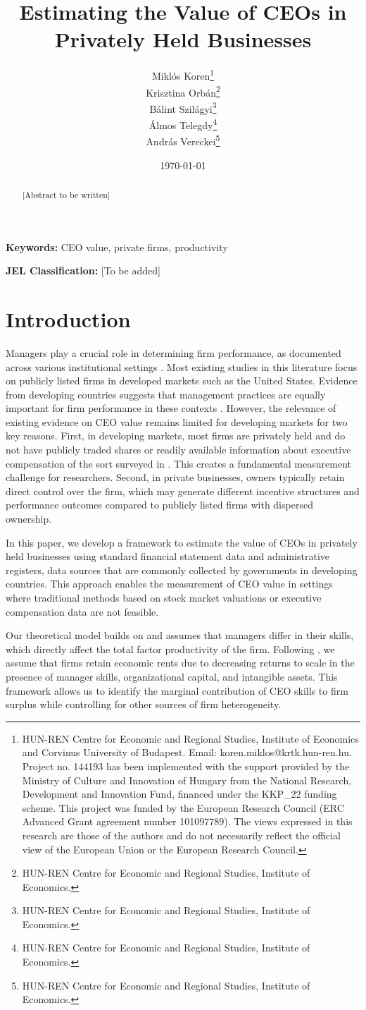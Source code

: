 \documentclass[11pt,a4paper]{article}
\title{Estimating the Value of CEOs in Privately Held Businesses}
\author{Miklós Koren\thanks{HUN-REN Centre for Economic and Regional Studies, Institute of Economics and Corvinus University of Budapest. Email: koren.miklos@krtk.hun-ren.hu. Project no. 144193 has been implemented with the support provided by the Ministry of Culture and Innovation of Hungary from the National Research, Development and Innovation Fund, financed under the KKP\_22 funding scheme. This project was funded by the European Research Council (ERC Advanced Grant agreement number 101097789). The views expressed in this research are those of the authors and do not necessarily reflect the official view of the European Union or the European Research Council.} \\
        Krisztina Orbán\thanks{HUN-REN Centre for Economic and Regional Studies, Institute of Economics.} \\
        Bálint Szilágyi\thanks{HUN-REN Centre for Economic and Regional Studies, Institute of Economics.} \\
        Álmos Telegdy\thanks{HUN-REN Centre for Economic and Regional Studies, Institute of Economics.} \\
        András Vereckei\thanks{HUN-REN Centre for Economic and Regional Studies, Institute of Economics.}}
\date{\today}
\begin{document}
\maketitle

\begin{abstract}
[Abstract to be written]
\end{abstract}

\textbf{Keywords:} CEO value, private firms, productivity

\textbf{JEL Classification:} [To be added]

\newpage

\section{Introduction}

Managers play a crucial role in determining firm performance, as documented across various institutional settings \citep{Bertrand2003-io, Fisman2014-pw, bandiera2020ceo, bennedsen2020ceos}. Most existing studies in this literature focus on publicly listed firms in developed markets such as the United States. Evidence from developing countries suggests that management practices are equally important for firm performance in these contexts \citep{Bloom2014-ux}. However, the relevance of existing evidence on CEO value remains limited for developing markets for two key reasons. First, in developing markets, most firms are privately held and do not have publicly traded shares or readily available information about executive compensation of the sort surveyed in \citet{frydman2010executive}. This creates a fundamental measurement challenge for researchers. Second, in private businesses, owners typically retain direct control over the firm, which may generate different incentive structures and performance outcomes compared to publicly listed firms with dispersed ownership.

In this paper, we develop a framework to estimate the value of CEOs in privately held businesses using standard financial statement data and administrative registers, data sources that are commonly collected by governments in developing countries. This approach enables the measurement of CEO value in settings where traditional methods based on stock market valuations or executive compensation data are not feasible.

Our theoretical model builds on \citet{Lucas1978-rp} and assumes that managers differ in their skills, which directly affect the total factor productivity of the firm. Following \citet{AtkesonKehoe2005JPE, McGrattan2012RED}, we assume that firms retain economic rents due to decreasing returns to scale in the presence of manager skills, organizational capital, and intangible assets. This framework allows us to identify the marginal contribution of CEO skills to firm surplus while controlling for other sources of firm heterogeneity.
\end{document}
